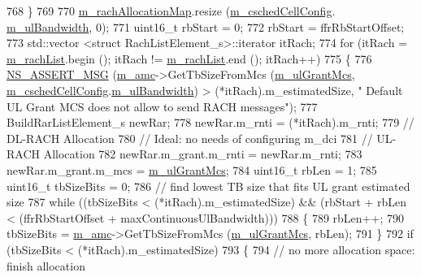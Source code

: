 \begin{DoxyCode}
768     \}
769 
770   \hyperlink{classns3_1_1TdTbfqFfMacScheduler_a09760afce6c2b248fbc5cbcffb9dede5}{m\_rachAllocationMap}.resize (\hyperlink{classns3_1_1TdTbfqFfMacScheduler_a3ac3e4b1b3818ff204d6ff6c89c19f4d}{m\_cschedCellConfig}.
      \hyperlink{structns3_1_1FfMacCschedSapProvider_1_1CschedCellConfigReqParameters_a5ab5b102878e6e7e7727a14af4a64d2f}{m\_ulBandwidth}, 0);
771   uint16\_t rbStart = 0;
772   rbStart = ffrRbStartOffset;
773   std::vector <struct RachListElement\_s>::iterator itRach;
774   \textcolor{keywordflow}{for} (itRach = \hyperlink{classns3_1_1TdTbfqFfMacScheduler_a103dfe516b13e9ca8e0d1247c11b3679}{m\_rachList}.begin (); itRach != \hyperlink{classns3_1_1TdTbfqFfMacScheduler_a103dfe516b13e9ca8e0d1247c11b3679}{m\_rachList}.end (); itRach++)
775     \{
776       \hyperlink{assert_8h_aff5ece9066c74e681e74999856f08539}{NS\_ASSERT\_MSG} (\hyperlink{classns3_1_1TdTbfqFfMacScheduler_a42e469f5ce9e3e079123f5c9a60fe7c4}{m\_amc}->GetTbSizeFromMcs (\hyperlink{classns3_1_1TdTbfqFfMacScheduler_a7382f05e10e61de33d6559202a1252bd}{m\_ulGrantMcs}, 
      \hyperlink{classns3_1_1TdTbfqFfMacScheduler_a3ac3e4b1b3818ff204d6ff6c89c19f4d}{m\_cschedCellConfig}.\hyperlink{structns3_1_1FfMacCschedSapProvider_1_1CschedCellConfigReqParameters_a5ab5b102878e6e7e7727a14af4a64d2f}{m\_ulBandwidth}) > (*itRach).m\_estimatedSize, \textcolor{stringliteral}{" Default UL
       Grant MCS does not allow to send RACH messages"});
777       BuildRarListElement\_s newRar;
778       newRar.m\_rnti = (*itRach).m\_rnti;
779       \textcolor{comment}{// DL-RACH Allocation}
780       \textcolor{comment}{// Ideal: no needs of configuring m\_dci}
781       \textcolor{comment}{// UL-RACH Allocation}
782       newRar.m\_grant.m\_rnti = newRar.m\_rnti;
783       newRar.m\_grant.m\_mcs = \hyperlink{classns3_1_1TdTbfqFfMacScheduler_a7382f05e10e61de33d6559202a1252bd}{m\_ulGrantMcs};
784       uint16\_t rbLen = 1;
785       uint16\_t tbSizeBits = 0;
786       \textcolor{comment}{// find lowest TB size that fits UL grant estimated size}
787       \textcolor{keywordflow}{while} ((tbSizeBits < (*itRach).m\_estimatedSize) && (rbStart + rbLen < (ffrRbStartOffset + 
      maxContinuousUlBandwidth)))
788         \{
789           rbLen++;
790           tbSizeBits = \hyperlink{classns3_1_1TdTbfqFfMacScheduler_a42e469f5ce9e3e079123f5c9a60fe7c4}{m\_amc}->GetTbSizeFromMcs (\hyperlink{classns3_1_1TdTbfqFfMacScheduler_a7382f05e10e61de33d6559202a1252bd}{m\_ulGrantMcs}, rbLen);
791         \}
792       \textcolor{keywordflow}{if} (tbSizeBits < (*itRach).m\_estimatedSize)
793         \{
794           \textcolor{comment}{// no more allocation space: finish allocation}

\end{DoxyCode}
